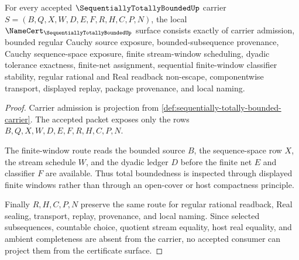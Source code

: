 \begin{theorem}
\label{thm:sequentially-totally-bounded-namecert-obligations}
For every accepted $\SequentiallyTotallyBoundedUp$ carrier $S=(B,Q,X,W,D,E,F,R,H,C,P,N)$, the local $\NameCert_{\SequentiallyTotallyBoundedUp}$ surface consists exactly of carrier admission, bounded regular Cauchy source exposure, bounded-subsequence provenance, Cauchy sequence-space exposure, finite stream-window scheduling, dyadic tolerance exactness, finite-net assignment, sequential finite-window classifier stability, regular rational and Real readback non-escape, componentwise transport, displayed replay, package provenance, and local naming.
\end{theorem}
\begin{proof}
Carrier admission is projection from \autoref{def:sequentially-totally-bounded-carrier}. The accepted packet exposes only the rows $B,Q,X,W,D,E,F,R,H,C,P,N$.

The finite-window route reads the bounded source $B$, the sequence-space row $X$, the stream schedule $W$, and the dyadic ledger $D$ before the finite net $E$ and classifier $F$ are available. Thus total boundedness is inspected through displayed finite windows rather than through an open-cover or host compactness principle.

Finally $R,H,C,P,N$ preserve the same route for regular rational readback, Real sealing, transport, replay, provenance, and local naming. Since selected subsequences, countable choice, quotient stream equality, host real equality, and ambient completeness are absent from the carrier, no accepted consumer can project them from the certificate surface.
\end{proof}

